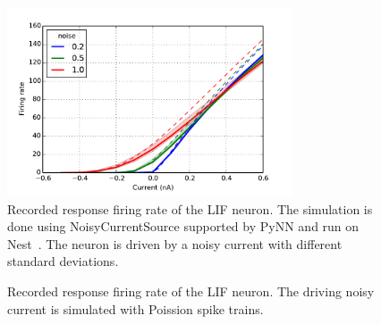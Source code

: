 \documentclass[runningheads,a4paper]{llncs}
\begin{document}
\begin{figure}[bt!]
	\centering
	\includegraphics[width=0.75\textwidth]{pic/2.pdf}
	\caption{
	Recorded response firing rate of the LIF neuron.
	The simulation is done using NoisyCurrentSource supported by PyNN and run on Nest~\cite{gewaltig2007nest}.
	The neuron is driven by a noisy current with different standard deviations. }
	\label{fig:lif_curr}	
\end{figure}

\begin{figure}[bt!]
	\centering
	\caption{
	Recorded response firing rate of the LIF neuron.
	The driving noisy current is simulated with Poission spike trains.}
	\label{fig:lif_pois}	
\end{figure}
\end{document}
